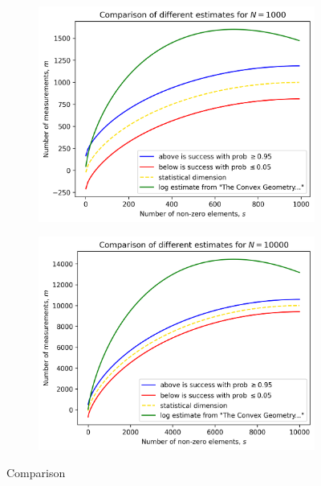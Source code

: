 \begin{figure}
    \begin{subfigure}{0.5\textwidth}
        \includegraphics[width=\linewidth]{pictures/compare_estimates1000}
    \end{subfigure}
    \begin{subfigure}{0.5\textwidth}
        \includegraphics[width=\linewidth]{pictures/compare_estimates10000}
    \end{subfigure}
    \caption{Comparison}
    \label{fig:compare}
\end{figure}